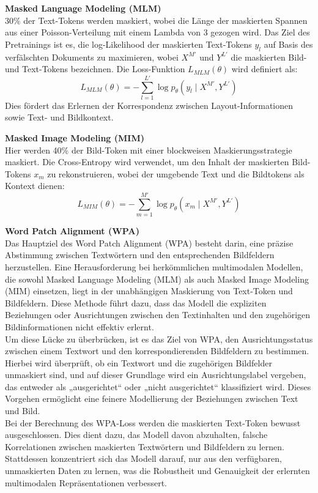 \documentclass[12pt,a4paper,twoside]{article}
\begin{document}
\textbf{Masked Language Modeling (MLM)}\\
30\% der Text-Tokens werden maskiert, wobei die Länge der maskierten Spannen aus einer Poisson-Verteilung mit einem Lambda von 3 gezogen wird. Das Ziel des Pretrainings ist es, die log-Likelihood der maskierten Text-Tokens \(y_l\) auf Basis des verfälschten Dokuments zu maximieren, wobei \(X^{M'}\) und \(Y^{L'}\) die maskierten Bild- und Text-Tokens bezeichnen. Die Loss-Funktion \(L_{MLM}(\theta)\) wird definiert als:
\[
L_{MLM}(\theta) = -\sum_{l=1}^{L'} \log p_{\theta}(y_l \mid X^{M'}, Y^{L'})
\]
Dies fördert das Erlernen der Korrespondenz zwischen Layout-Informationen sowie Text- und Bildkontext.

\textbf{Masked Image Modeling (MIM)}\\
Hier werden 40\% der Bild-Token mit einer blockweisen Maskierungsstrategie maskiert. Die Cross-Entropy wird verwendet, um den Inhalt der maskierten Bild-Tokens \(x_m\) zu rekonstruieren, wobei der umgebende Text und die Bildtokens als Kontext dienen:
\[
L_{MIM}(\theta) = -\sum_{m=1}^{M'} \log p_{\theta}(x_m \mid X^{M'}, Y^{L'})
\]

\textbf{Word Patch Alignment (WPA)}\\
Das Hauptziel des Word Patch Alignment (WPA) besteht darin, eine präzise Abstimmung zwischen Textwörtern und den entsprechenden Bildfeldern herzustellen. Eine Herausforderung bei herkömmlichen multimodalen Modellen, die sowohl Masked Language Modeling (MLM) als auch Masked Image Modeling (MIM) einsetzen, liegt in der unabhängigen Maskierung von Text-Token und Bildfeldern. Diese Methode führt dazu, dass das Modell die expliziten Beziehungen oder Ausrichtungen zwischen den Textinhalten und den zugehörigen Bildinformationen nicht effektiv erlernt.\\

Um diese Lücke zu überbrücken, ist es das Ziel von WPA, den Ausrichtungsstatus zwischen einem Textwort und den korrespondierenden Bildfeldern zu bestimmen. Hierbei wird überprüft, ob ein Textwort und die zugehörigen Bildfelder unmaskiert sind, und auf dieser Grundlage wird ein Ausrichtungslabel vergeben, das entweder als „ausgerichtet“ oder „nicht ausgerichtet“ klassifiziert wird. Dieses Vorgehen ermöglicht eine feinere Modellierung der Beziehungen zwischen Text und Bild.
\\
Bei der Berechnung des WPA-Loss werden die maskierten Text-Token bewusst ausgeschlossen. Dies dient dazu, das Modell davon abzuhalten, falsche Korrelationen zwischen maskierten Textwörtern und Bildfeldern zu lernen. Stattdessen konzentriert sich das Modell darauf, nur aus den verfügbaren, unmaskierten Daten zu lernen, was die Robustheit und Genauigkeit der erlernten multimodalen Repräsentationen verbessert.
\end{document}
